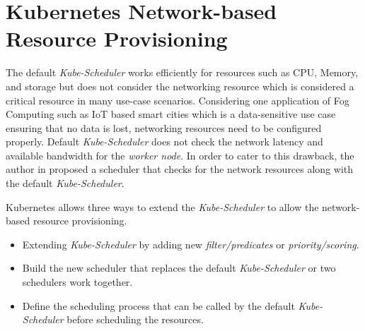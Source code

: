 \section{Kubernetes Network-based Resource Provisioning}
\label{sec:k8s_ns}
The default \emph{Kube-Scheduler} works efficiently for resources such as CPU, Memory, and storage but does not consider the networking resource which is considered a critical resource in many use-case scenarios\cite{Santos2019}. Considering one application of Fog Computing such as IoT based smart cities which is a data-sensitive use case ensuring that no data is lost, networking resources need to be configured properly\cite{Santos2019}. Default \emph{Kube-Scheduler} does not check the network latency and available bandwidth for the \emph{worker node}. In order to cater to this drawback, the author in \cite{Santos2019} proposed a scheduler that checks for the network resources along with the default \emph{Kube-Scheduler}\cite{Santos2019}. \par
Kubernetes allows three ways to extend the \emph{Kube-Scheduler} to allow the network-based resource provisioning\cite{k8s}.
\begin{itemize}
  \item Extending \emph{Kube-Scheduler} by adding new \emph{filter/predicates} or \emph{priority/scoring}.
  \item Build the new scheduler that replaces the default \emph{Kube-Scheduler} or two schedulers work together.
  \item Define the scheduling process that can be called by the default \emph{Kube-Scheduler} before scheduling the resources.
\end{itemize}
